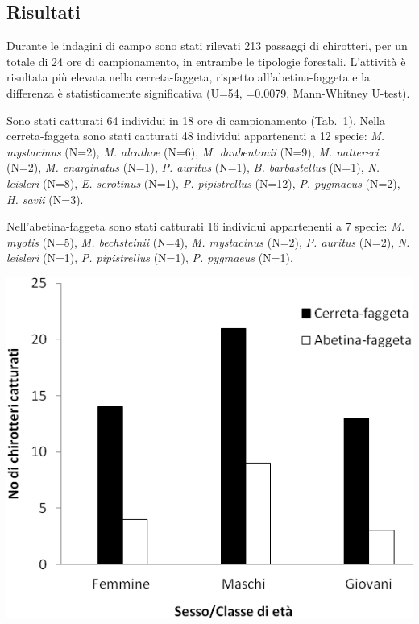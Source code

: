 \begin{multicols}{2}
\section*{Risultati}
Durante le indagini di campo sono stati rilevati 213 passaggi di chirotteri, per un totale di 24 ore di campionamento, in entrambe le tipologie forestali. L’attività è risultata più elevata nella cerreta-faggeta, rispetto all’abetina-faggeta e la differenza è statisticamente significativa (U=54, \prob{}=0.0079, Mann-Whitney U-test).
 
Sono stati catturati 64 individui in 18 ore di campionamento (Tab.~1). Nella cerreta-faggeta sono stati catturati 48 individui appartenenti a 12 specie: \emph{M. mystacinus} (N=2), \emph{M. alcathoe} (N=6), \emph{M. daubentonii} (N=9), \emph{M. nattereri} (N=2), \emph{M. enarginatus} (N=1), \emph{P. auritus} (N=1), \emph{B. barbastellus} (N=1), \emph{N. leisleri} (N=8), \emph{E. serotinus} (N=1), \emph{P. pipistrellus} (N=12), \emph{P. pygmaeus} (N=2), \emph{H. savii} (N=3).
 
Nell’abetina-faggeta sono stati catturati 16 individui appartenenti a 7 specie: \emph{M. myotis} (N=5), \emph{M. bechsteinii} (N=4), \emph{M. mystacinus} (N=2), \emph{P. auritus} (N=2), \emph{N. leisleri} (N=1), \emph{P. pipistrellus} (N=1), \emph{P. pygmaeus} (N=1).

\begin{Figure} %
  \centering\small
  \includegraphics[width=\linewidth]{abstracts/extended_abstracts/P005_Figure1.png}
\end{Figure}



\end{multicols}
